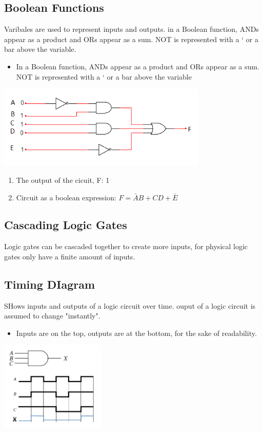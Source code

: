 \documentclass[a4paper,12pt]{article}
\begin{document}
        \subsection*{Boolean Functions}
            Varibales are used to represent inputs and outputs. in a Boolean function, ANDs appear as a product and ORs appear as a sum. NOT is represented with a ‘ or a bar above the variable.
            \begin{itemize}
                \item In a Boolean function, ANDs appear as a product and ORs appear as a sum. NOT is represented with a ‘ or a bar above the variable
            \end{itemize}
            \includegraphics*[width=10cm]{circuit1.png}
            \begin{enumerate}
                \item The output of the cicuit, F: 1
                \item Circuit as a boolean expression: $F=\bar{A}B+CD+\bar{E}$
            \end{enumerate}

            \subsection*{Cascading Logic Gates}
                Logic gates can be cascaded together to create more inputs, for physical logic gates only have a finite amount of inputs.

            \subsection*{Timing DIagram}
                SHows inputs and outputs of a logic circuit over time. ouput of a logic circuit is assumed to change "instantly".
                \begin{itemize}
                    \item Inputs are on the top, outputs are at the bottom, for the sake of readability.
                \end{itemize}
                \begin{center}\includegraphics*[width=5cm]{Timing Diagram.png}\end{center}
\end{document}
